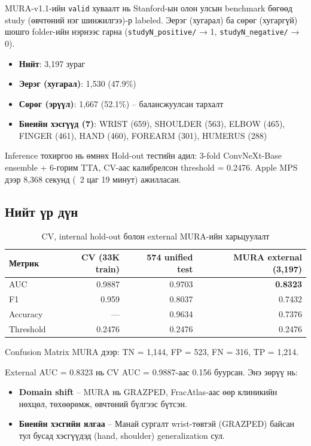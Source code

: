 MURA-v1.1-ийн \texttt{valid} хуваалт нь Stanford-ын олон улсын benchmark бөгөөд study (өвчтөний нэг шинжилгээ)-р labeled. Эерэг (хугарал) ба сөрөг (хугаргүй) шошго folder-ийн нэрнээс гарна (\texttt{studyN\_positive/} → 1, \texttt{studyN\_negative/} → 0).

\begin{itemize}
    \item \textbf{Нийт}: 3{,}197 зураг
    \item \textbf{Эерэг (хугарал)}: 1{,}530 (47.9\%)
    \item \textbf{Сөрөг (эрүүл)}: 1{,}667 (52.1\%) -- балансжуулсан тархалт
    \item \textbf{Биеийн хэсгүүд (7)}: WRIST (659), SHOULDER (563), ELBOW (465), FINGER (461), HAND (460), FOREARM (301), HUMERUS (288)
\end{itemize}

Inference тохиргоо нь өмнөх Hold-out тестийн адил: 3-fold ConvNeXt-Base ensemble + 6-горим TTA, CV-аас калибрелсон threshold = 0.2476. Apple MPS дээр 8{,}368 секунд (~2 цаг 19 минут) ажилласан.

\subsection*{Нийт үр дүн}

\begin{table}[!htbp]
    \centering
    \begin{tabular}{l r r r}
    \toprule
    \textbf{Метрик} & \textbf{CV (33K train)} & \textbf{574 unified test} & \textbf{MURA external (3{,}197)} \\
    \midrule
    AUC        & 0.9887 & 0.9703 & \textbf{0.8323} \\[4pt]
    F1         & 0.959  & 0.8037 & 0.7432 \\[4pt]
    Accuracy   & ---    & 0.9634 & 0.7376 \\[4pt]
    Threshold  & 0.2476 & 0.2476 & 0.2476 \\
    \bottomrule
    \end{tabular}
    \caption{CV, internal hold-out болон external MURA-ийн харьцуулалт}
    \label{tab:mura_overall}
\end{table}

Confusion Matrix MURA дээр: TN = 1{,}144, FP = 523, FN = 316, TP = 1{,}214.

External AUC = 0.8323 нь CV AUC = 0.9887-аас 0.156 буурсан. Энэ зөрүү нь:

\begin{itemize}
    \item \textbf{Domain shift} -- MURA нь GRAZPED, FracAtlas-аас өөр клиникийн нөхцөл, төхөөрөмж, өвчтөний бүлгээс бүтсэн.
    \item \textbf{Биеийн хэсгийн ялгаа} -- Манай сургалт wrist-төвтэй (GRAZPED) байсан тул бусад хэсгүүдэд (hand, shoulder) generalization сул.
\end{itemize}

